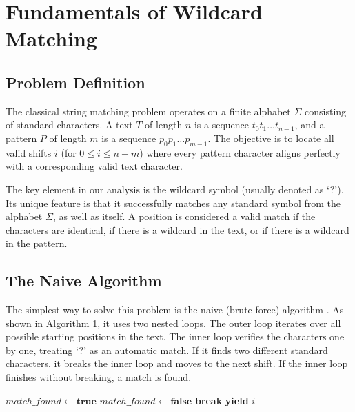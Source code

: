 \chapter{Fundamentals of Wildcard Matching}

\section{Problem Definition}

\begin{definition}
The classical string matching problem operates on a finite alphabet $\Sigma$ consisting of standard characters. A text $T$ of length $n$ is a sequence $t_0 t_1 \dots t_{n-1}$, and a pattern $P$ of length $m$ is a sequence $p_0 p_1 \dots p_{m-1}$. The objective is to locate all valid shifts $i$ (for $0 \le i \le n - m$) where every pattern character aligns perfectly with a corresponding valid text character.
\end{definition}

\begin{definition}
The key element in our analysis is the wildcard symbol (usually denoted as `?'). Its unique feature is that it successfully matches any standard symbol from the alphabet $\Sigma$, as well as itself. A position is considered a valid match if the characters are identical, if there is a wildcard in the text, or if there is a wildcard in the pattern.
\end{definition}

\section{The Naive Algorithm}

The simplest way to solve this problem is the naive (brute-force) algorithm \cite{aho1990}. As shown in Algorithm 1, it uses two nested loops. The outer loop iterates over all possible starting positions in the text. The inner loop verifies the characters one by one, treating `?' as an automatic match. If it finds two different standard characters, it breaks the inner loop and moves to the next shift. If the inner loop finishes without breaking, a match is found.

\begin{algorithm}[H]
\caption{Naive Brute-Force Matching}
\begin{algorithmic}[1]
        \State $\mathit{match\_found} \gets \textbf{true}$
                \State $\mathit{match\_found} \gets \textbf{false}$
                \State \textbf{break}
            \EndIf
        \EndFor
            \State \textbf{yield} $i$
        \EndIf
    \EndFor
\EndFunction
\end{algorithmic}
\end{algorithm}

